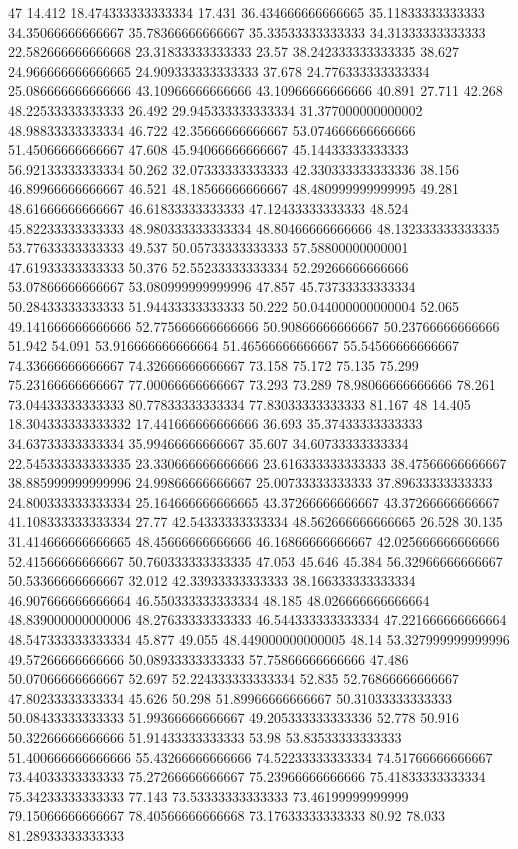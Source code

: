 47 14.412 18.474333333333334 17.431 36.434666666666665 35.11833333333333 34.35066666666667 35.78366666666667 35.33533333333333 34.31333333333333 22.582666666666668 23.31833333333333 23.57 38.242333333333335 38.627 24.966666666666665 24.909333333333333 37.678 24.776333333333334 25.086666666666666 43.10966666666666 43.10966666666666 40.891 27.711 42.268 48.22533333333333 26.492 29.945333333333334 31.377000000000002 48.98833333333334 46.722 42.35666666666667 53.074666666666666 51.45066666666667 47.608 45.94066666666667 45.14433333333333 56.92133333333334 50.262 32.07333333333333 42.330333333333336 38.156 46.89966666666667 46.521 48.18566666666667 48.480999999999995 49.281 48.61666666666667 46.61833333333333 47.12433333333333 48.524 45.82233333333333 48.980333333333334 48.80466666666666 48.132333333333335 53.77633333333333 49.537 50.05733333333333 57.58800000000001 47.61933333333333 50.376 52.55233333333334 52.29266666666666 53.07866666666667 53.080999999999996 47.857 45.73733333333334 50.28433333333333 51.94433333333333 50.222 50.044000000000004 52.065 49.141666666666666 52.775666666666666 50.90866666666667 50.23766666666666 51.942 54.091 53.916666666666664 51.46566666666667 55.54566666666667 74.33666666666667 74.32666666666667 73.158 75.172 75.135 75.299 75.23166666666667 77.00066666666667 73.293 73.289 78.98066666666666 78.261 73.04433333333333 80.77833333333334 77.83033333333333 81.167
48 14.405 18.304333333333332 17.441666666666666 36.693 35.37433333333333 34.63733333333334 35.99466666666667 35.607 34.60733333333334 22.545333333333335 23.330666666666666 23.616333333333333 38.47566666666667 38.885999999999996 24.99866666666667 25.00733333333333 37.89633333333333 24.800333333333334 25.164666666666665 43.37266666666667 43.37266666666667 41.108333333333334 27.77 42.54333333333334 48.562666666666665 26.528 30.135 31.414666666666665 48.45666666666666 46.16866666666667 42.025666666666666 52.41566666666667 50.760333333333335 47.053 45.646 45.384 56.32966666666667 50.53366666666667 32.012 42.33933333333333 38.166333333333334 46.907666666666664 46.550333333333334 48.185 48.026666666666664 48.839000000000006 48.27633333333333 46.544333333333334 47.221666666666664 48.547333333333334 45.877 49.055 48.449000000000005 48.14 53.327999999999996 49.57266666666666 50.08933333333333 57.75866666666666 47.486 50.07066666666667 52.697 52.224333333333334 52.835 52.76866666666667 47.80233333333334 45.626 50.298 51.89966666666667 50.31033333333333 50.08433333333333 51.99366666666667 49.205333333333336 52.778 50.916 50.32266666666666 51.91433333333333 53.98 53.83533333333333 51.400666666666666 55.43266666666666 74.52233333333334 74.51766666666667 73.44033333333333 75.27266666666667 75.23966666666666 75.41833333333334 75.34233333333333 77.143 73.53333333333333 73.46199999999999 79.15066666666667 78.40566666666668 73.17633333333333 80.92 78.033 81.28933333333333
